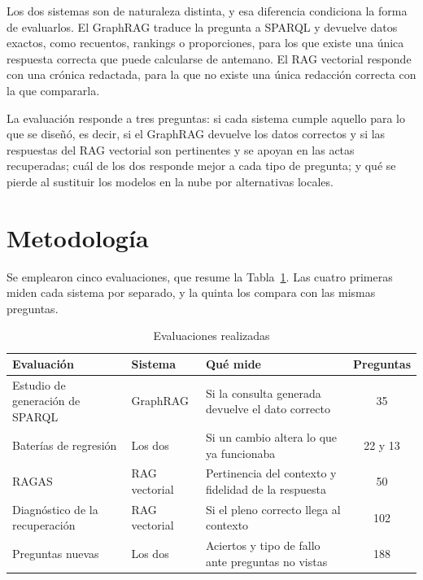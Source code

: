 \documentclass[11pt, a4paper]{report}
\begin{document}
	Los dos sistemas son de naturaleza distinta, y esa diferencia condiciona la
	forma de evaluarlos. El GraphRAG traduce la pregunta a SPARQL y devuelve datos
	exactos, como recuentos, rankings o proporciones, para los que existe una
	única respuesta correcta que puede calcularse de antemano. El RAG vectorial
	responde con una crónica redactada, para la que no existe una única redacción
	correcta con la que compararla.

	La evaluación responde a tres preguntas: si cada sistema cumple aquello para
	lo que se diseñó, es decir, si el GraphRAG devuelve los datos correctos y
	si las respuestas del RAG vectorial son pertinentes y se apoyan en las actas
	recuperadas; cuál de los dos responde mejor a cada tipo de pregunta; y qué se
	pierde al sustituir los modelos en la nube por
	alternativas locales.

	\section{Metodología}

	Se emplearon cinco evaluaciones, que resume la Tabla~\ref{tab:evaluaciones}.
	Las cuatro primeras miden cada sistema por separado, y la quinta los compara
	con las mismas preguntas.

	\begin{table}[H]
		\centering
		\begin{tabularx}{\linewidth}{|>{\raggedright\arraybackslash}p{4.4cm}|>{\raggedright\arraybackslash}p{2.4cm}|>{\raggedright\arraybackslash}X|c|}
			\hline
			\rowcolor{tabla-header}
			\textbf{Evaluación} & \textbf{Sistema} & \textbf{Qué mide} & \textbf{Preguntas} \\
			\hline
			Estudio de generación de SPARQL & GraphRAG & Si la consulta generada devuelve el dato correcto & 35 \\
			\hline
			\rowcolor{fila-alterna}
			Baterías de regresión & Los dos & Si un cambio altera lo que ya funcionaba & 22 y 13 \\
			\hline
			RAGAS & RAG vectorial & Pertinencia del contexto y fidelidad de la respuesta & 50 \\
			\hline
			\rowcolor{fila-alterna}
			Diagnóstico de la recuperación & RAG vectorial & Si el pleno correcto llega al contexto & 102 \\
			\hline
			Preguntas nuevas & Los dos & Aciertos y tipo de fallo ante preguntas no vistas & 188 \\
			\hline
		\end{tabularx}
		\caption{Evaluaciones realizadas}
		\label{tab:evaluaciones}
	\end{table}
\end{document}
